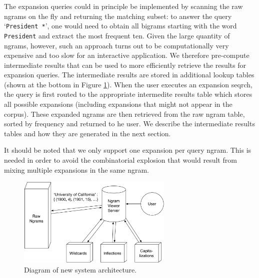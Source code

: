 \documentclass[11pt]{article}
\begin{document}
The expansion queries could in principle be implemented by scanning the raw ngrams on the fly and returning the matching subset: to answer the query `\texttt{President *}', one would need to obtain all bigrams starting with the word \texttt{President} and extract the most frequent ten. Given the large quantity of ngrams, however, such an approach turns out to be computationally very expensive and too slow for an interactive application. We therefore pre-compute intermediate results that can be used to more efficiently retrieve the results for expansion queries. The intermediate results are stored in additional lookup tables (shown at the bottom in Figure \ref{fig:architecture}). When the user executes an expansion seqrch, the query is first routed to the appropriate intermedite results table which stores all possible expansions (including expansions that might not appear in the corpus).  These expanded ngrams are then retrieved from the raw ngram table, sorted by frequency and returned to he user.
We describe the intermediate results tables and how they are generated in the next section.

It should be noted that we only support one expansion per query ngram. This is needed in order to avoid the combinatorial explosion that would result from mixing multiple expansions in the same ngram.

\begin{figure}
\includegraphics[width=20em,keepaspectratio=true]{system_architecture}
\caption{\label{fig:architecture}Diagram of new system architecture.}
\end{figure}
\end{document}
